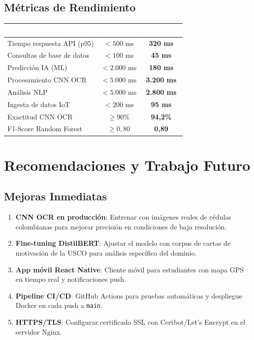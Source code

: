 \documentclass[12pt,a4paper,twoside]{report}
\begin{document}
\section{Métricas de Rendimiento}
\begin{center}
\begin{tabularx}{\textwidth}{|X|c|c|}
\hline
\rowcolor{tableHdr}
\textcolor{white}{\textbf{Métrica}} &
\textcolor{white}{\textbf{Objetivo}} &
\textcolor{white}{\textbf{Alcanzado}} \\
\hline
\rowcolor{rowOdd}Tiempo respuesta API (p95) & $< 500$ ms & \textbf{320 ms} \\
\hline\rowcolor{rowEven}Consultas de base de datos & $< 100$ ms & \textbf{45 ms} \\
\hline\rowcolor{rowOdd}Predicción IA (ML) & $< 2.000$ ms & \textbf{180 ms} \\
\hline\rowcolor{rowEven}Procesamiento CNN OCR & $< 5.000$ ms & \textbf{3.200 ms} \\
\hline\rowcolor{rowOdd}Análisis NLP & $< 5.000$ ms & \textbf{2.800 ms} \\
\hline\rowcolor{rowEven}Ingesta de datos IoT & $< 200$ ms & \textbf{95 ms} \\
\hline\rowcolor{rowOdd}Exactitud CNN OCR & $\geq 90\%$ & \textbf{94,2\%} \\
\hline\rowcolor{rowEven}F1-Score Random Forest & $\geq 0{,}80$ & \textbf{0,89} \\
\hline
\end{tabularx}
\end{center}

\chapter{Recomendaciones y Trabajo Futuro}

\section{Mejoras Inmediatas}
\begin{enumerate}[leftmargin=*]
\item \textbf{CNN OCR en producción}: Entrenar con imágenes reales de cédulas colombianas para mejorar precisión en condiciones de baja resolución.
\item \textbf{Fine-tuning DistilBERT}: Ajustar el modelo con corpus de cartas de motivación de la USCO para análisis específico del dominio.
\item \textbf{App móvil React Native}: Cliente móvil para estudiantes con mapa GPS en tiempo real y notificaciones push.
\item \textbf{Pipeline CI/CD}: GitHub Actions para pruebas automáticas y despliegue Docker en cada push a \texttt{main}.
\item \textbf{HTTPS/TLS}: Configurar certificado SSL con Certbot/Let's Encrypt en el servidor Nginx.
\end{enumerate}
\end{document}

